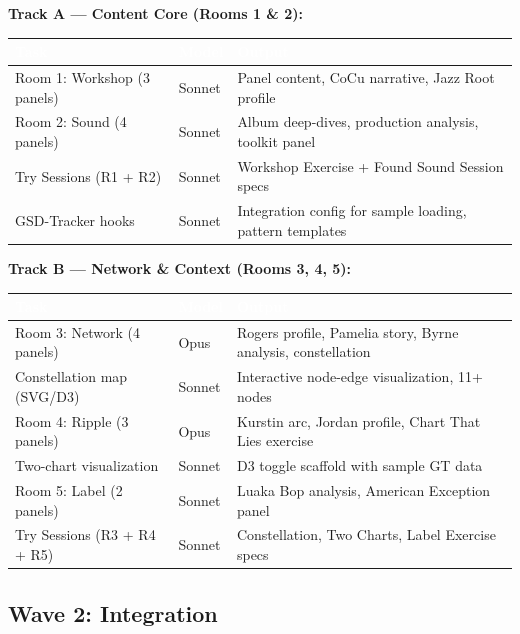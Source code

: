 \documentclass[11pt,letterpaper]{article}
\newcommand{\tableheader}[1]{\textbf{\sffamily\textcolor{white}{#1}}}
\begin{document}
\textbf{Track A --- Content Core (Rooms 1 \& 2):}

\begin{center}
\begin{tabularx}{\textwidth}{L{4cm}C{1.5cm}X}
\toprule
{}
\tableheader{Task} & \tableheader{Model} & \tableheader{Output} \\
\midrule
Room 1: Workshop (3 panels) & Sonnet & Panel content, CoCu narrative, Jazz Root profile \\
Room 2: Sound (4 panels) & Sonnet & Album deep-dives, production analysis, toolkit panel \\
Try Sessions (R1 + R2) & Sonnet & Workshop Exercise + Found Sound Session specs \\
GSD-Tracker hooks & Sonnet & Integration config for sample loading, pattern templates \\
\bottomrule
\end{tabularx}
\end{center}

\textbf{Track B --- Network \& Context (Rooms 3, 4, 5):}

\begin{center}
\begin{tabularx}{\textwidth}{L{4cm}C{1.5cm}X}
\toprule
{}
\tableheader{Task} & \tableheader{Model} & \tableheader{Output} \\
\midrule
Room 3: Network (4 panels) & Opus & Rogers profile, Pamelia story, Byrne analysis, constellation \\
Constellation map (SVG/D3) & Sonnet & Interactive node-edge visualization, 11+ nodes \\
Room 4: Ripple (3 panels) & Opus & Kurstin arc, Jordan profile, Chart That Lies exercise \\
Two-chart visualization & Sonnet & D3 toggle scaffold with sample GT data \\
Room 5: Label (2 panels) & Sonnet & Luaka Bop analysis, American Exception panel \\
Try Sessions (R3 + R4 + R5) & Sonnet & Constellation, Two Charts, Label Exercise specs \\
\bottomrule
\end{tabularx}
\end{center}

\subsection{Wave 2: Integration}
\end{document}
